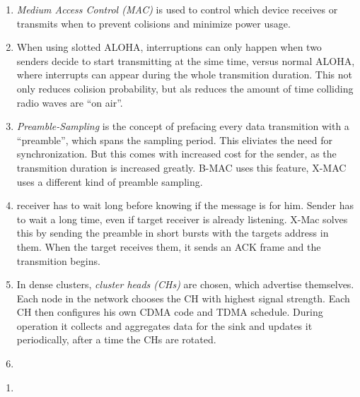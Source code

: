 

\date{Monday, 31.05.2020}


    \maketitle
    \thispagestyle{fancy}

    \begin{enumerate}
        \item \emph{Medium Access Control (MAC)} is used to control which device receives or transmits when to prevent colisions and minimize power usage.
        \item When using slotted ALOHA, interruptions can only happen when two senders decide to start transmitting at the sime time, versus normal ALOHA, where interrupts can appear during the whole transmition duration. This not only reduces colision probability, but als reduces the amount of time colliding radio waves are ``on air''.
        \item \emph{Preamble-Sampling} is the concept of prefacing every data transmition with a ``preamble'', which spans the sampling period. This eliviates the need for synchronization. But this comes with increased cost for the sender, as the transmition duration is increased greatly. B-MAC uses this feature, X-MAC uses a different kind of preamble sampling.
        \item receiver has to wait long before knowing if the message is for him. Sender has to wait a long time, even if target receiver is already listening. X-Mac solves this by sending the preamble in short bursts with the targets address in them. When the target receives them, it sends an ACK frame and the transmition begins.
        \item In dense clusters, \emph{cluster heads (CHs)} are chosen, which advertise themselves. Each node in the network chooses the CH with highest signal strength. Each CH then configures his own CDMA code and TDMA schedule. During operation it collects and aggregates data for the sink and updates it periodically, after a time the CHs are rotated.
        \item 
    \end{enumerate}


    \begin{enumerate}
        \item 
    \end{enumerate}

    
